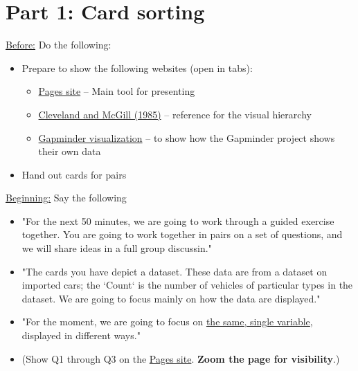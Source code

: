\documentclass[11pt]{article}
\begin{document}
\section{Part 1: Card sorting}
\label{sec:org78f8136}
\uline{Before:} Do the following:
\begin{itemize}
\item Prepare to show the following websites (open in tabs):
\begin{itemize}
\item \href{https://citrineinformatics.github.io/ga-tech-workshop/05-vis-principles/index.html}{Pages site} -- Main tool for presenting
\item \href{http://ils.unc.edu/courses/2015\_spring/inls541\_001/Readings/Cleveland\%20and\%20McGill\%201985\%20-\%20Graphical\%20Perception\%20and\%20Cleveland1985-Graphical\%20Methods\%20for\%20Analyzing\%20Scientific\%20Data.pdf}{Cleveland and McGill (1985)} -- reference for the visual hierarchy
\item \href{https://www.gapminder.org/tools/\#\$chart-type=bubbles}{Gapminder visualization} -- to show how the Gapminder project shows their own data
\end{itemize}
\item Hand out cards for pairs
\end{itemize}

\uline{Beginning:} Say the following
\begin{itemize}
\item "For the next 50 minutes, we are going to work through a guided exercise
together. You are going to work together in pairs on a set of questions, and
we will share ideas in a full group discussin."
\item "The cards you have depict a dataset. These data are from a dataset on
imported cars; the `Count` is the number of vehicles of particular types in
the dataset. We are going to focus mainly on how the data are displayed."
\item "For the moment, we are going to focus on \uline{the same, single variable},
displayed in different ways."
\item (Show Q1 through Q3 on the \href{https://citrineinformatics.github.io/ga-tech-workshop/05-vis-principles/index.html}{Pages site}. \textbf{Zoom the page for visibility}.)
\end{itemize}
\end{document}
